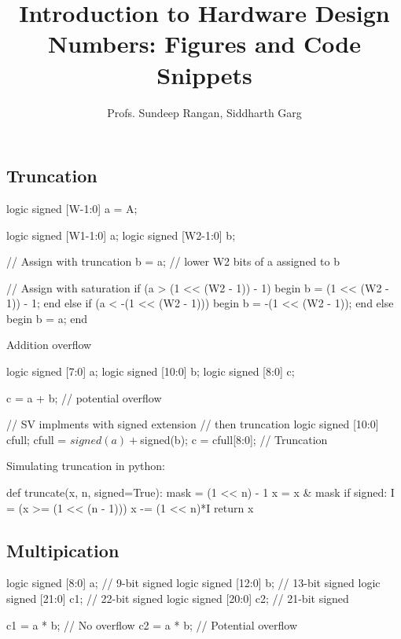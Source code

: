\documentclass[11pt]{article}
\begin{document}
\title{Introduction to Hardware Design\\
Numbers:  Figures and Code Snippets}
\author{Profs. Sundeep Rangan, Siddharth Garg}
\date{}

\maketitle

\subsection{Truncation}

\begin{systemverilogcode}

    logic signed [W-1:0] a = A;

\end{systemverilogcode}

\begin{systemverilogcode}
    logic signed [W1-1:0] a;
    logic signed [W2-1:0] b;

    // Assign with truncation
    b = a; // lower W2 bits of a assigned to b

    // Assign with saturation
    if (a > (1 << (W2 - 1)) - 1) begin
        b = (1 << (W2 - 1)) - 1;
    end else if (a < -(1 << (W2 - 1))) begin
        b = -(1 << (W2 - 1));
    end else begin
        b = a;
    end
\end{systemverilogcode}


Addition overflow
\begin{systemverilogcode}
logic signed [7:0] a;
logic signed [10:0] b;
logic signed [8:0] c;

c = a + b; // potential overflow

// SV implments with signed extension 
// then truncation
logic signed [10:0] cfull;
cfull = $signed(a) + $signed(b);
c = cfull[8:0]; // Truncation
\end{systemverilogcode}
    

Simulating truncation in python:
\begin{pythoncode}
def truncate(x, n, signed=True):
    mask = (1 << n) - 1
    x = x & mask
    if signed:
        I = (x >= (1 << (n - 1)))
        x -= (1 << n)*I
    return x
\end{pythoncode}

\pagebreak
\subsection{Multipication}
\begin{systemverilogcode}
logic signed [8:0] a;   // 9-bit signed
logic signed [12:0] b;  // 13-bit signed
logic signed [21:0] c1;  // 22-bit signed
logic signed [20:0] c2;  // 21-bit signed

c1 = a * b; // No overflow
c2 = a * b; // Potential overflow
\end{systemverilogcode}

  
\end{document}
